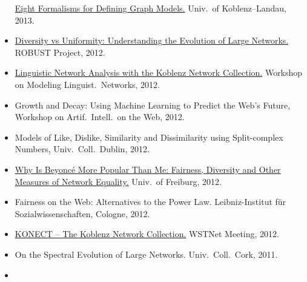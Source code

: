 \documentclass[line,mm]{res}
\newcounter{x}
\newcounter{y}
\newcommand{\talknumber}{T\arabic{y}\stepcounter{y}}
\begin{document}
\begin{resume}
\begin{itemize}
    \href{https://www.slideshare.net/kunegis/eight-ways}{Eight
      Formalisms for Defining Graph Models.}  Univ.\ of Koblenz--Landau,
    2013.  
  \item[{[\talknumber]}]
    \href{https://github.com/kunegis/pdfs/blob/master/kunegis:diversity-uniformity.presentation.pdf}{Diversity
      vs Uniformity:  Understanding the Evolution of Large Networks.}
    ROBUST Project, 2012. 
  \item[{[\talknumber]}] 
    \href{https://github.com/kunegis/pdfs/blob/master/kunegis:modeling-linguistic-networks.presentation.pdf}{Linguistic
      Network Analysis with the Koblenz Network Collection.}  
    Workshop on Modeling Linguist.\ Networks, 2012. 
  \item[{[\talknumber]}] Growth and Decay: Using Machine Learning to Predict the Web's
    Future, Workshop on Artif.\ Intell.\ on the Web, 2012. 
  \item[{[\talknumber]}] Models of Like, Dislike, Similarity and Dissimilarity using
    Split-complex Numbers, Univ.\ Coll.\ Dublin, 2012. 
  \item[{[\talknumber]}] 
    \href{https://www.slideshare.net/kunegis/why-beyonc-is-more-popular-than-me-fairness-diversity-and-other-measures}{Why Is Beyoncé More Popular Than Me:  Fairness, Diversity and
    Other Measures of Network Equality.} Univ.\ of Freiburg, 2012. 
  \item[{[\talknumber]}] Fairness on the Web: Alternatives to the Power
    Law. 
    Leibniz-Institut für Sozialwissenschaften, Cologne, 2012.  
  \item[{[\talknumber]}] 
    \href{https://github.com/kunegis/pdfs/blob/master/kunegis:network-survey.presentation.pdf}{KONECT
      -- The Koblenz Network Collection.}  WSTNet Meeting, 2012.  
  \item[{[\talknumber]}] On the Spectral Evolution of Large Networks.  Univ.\ Coll.\ Cork, 2011.   
  \item[{[\talknumber]}] 

\end{itemize}
\end{resume}
\end{document}
